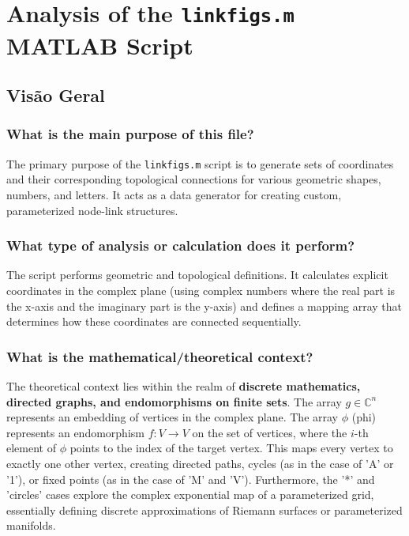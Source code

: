 \chapter{Analysis of the \texttt{linkfigs.m} MATLAB Script}
\date{\today}


\section{Visão Geral}

\subsection*{What is the main purpose of this file?}
The primary purpose of the \texttt{linkfigs.m} script is to generate sets of coordinates and their corresponding topological connections for various geometric shapes, numbers, and letters. It acts as a data generator for creating custom, parameterized node-link structures.

\subsection*{What type of analysis or calculation does it perform?}
The script performs geometric and topological definitions. It calculates explicit coordinates in the complex plane (using complex numbers where the real part is the x-axis and the imaginary part is the y-axis) and defines a mapping array that determines how these coordinates are connected sequentially.

\subsection*{What is the mathematical/theoretical context?}
The theoretical context lies within the realm of \textbf{discrete mathematics, directed graphs, and endomorphisms on finite sets}. 
The array $g \in \mathbb{C}^n$ represents an embedding of vertices in the complex plane. The array $\phi$ (phi) represents an endomorphism $f: V \to V$ on the set of vertices, where the $i$-th element of $\phi$ points to the index of the target vertex. This maps every vertex to exactly one other vertex, creating directed paths, cycles (as in the case of 'A' or '1'), or fixed points (as in the case of 'M' and 'V'). Furthermore, the '*' and 'circles' cases explore the complex exponential map of a parameterized grid, essentially defining discrete approximations of Riemann surfaces or parameterized manifolds.

